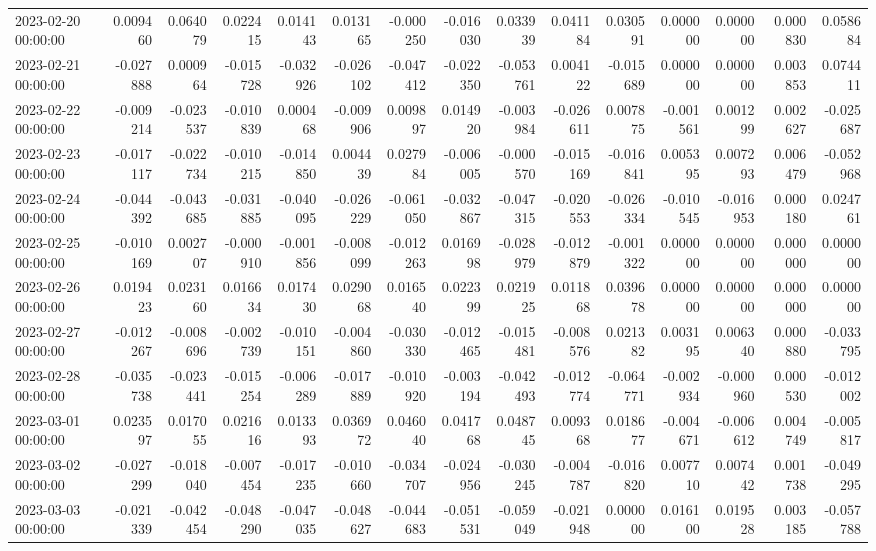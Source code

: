 \begin{tabular}{lrrrrrrrrrrrrrr}
2023-02-20 00:00:00 & 0.009460 & 0.064079 & 0.022415 & 0.014143 & 0.013165 & -0.000250 & -0.016030 & 0.033939 & 0.041184 & 0.030591 & 0.000000 & 0.000000 & 0.000830 & 0.058684 \\
2023-02-21 00:00:00 & -0.027888 & 0.000964 & -0.015728 & -0.032926 & -0.026102 & -0.047412 & -0.022350 & -0.053761 & 0.004122 & -0.015689 & 0.000000 & 0.000000 & 0.003853 & 0.074411 \\
2023-02-22 00:00:00 & -0.009214 & -0.023537 & -0.010839 & 0.000468 & -0.009906 & 0.009897 & 0.014920 & -0.003984 & -0.026611 & 0.007875 & -0.001561 & 0.001299 & 0.002627 & -0.025687 \\
2023-02-23 00:00:00 & -0.017117 & -0.022734 & -0.010215 & -0.014850 & 0.004439 & 0.027984 & -0.006005 & -0.000570 & -0.015169 & -0.016841 & 0.005395 & 0.007293 & 0.006479 & -0.052968 \\
2023-02-24 00:00:00 & -0.044392 & -0.043685 & -0.031885 & -0.040095 & -0.026229 & -0.061050 & -0.032867 & -0.047315 & -0.020553 & -0.026334 & -0.010545 & -0.016953 & 0.000180 & 0.024761 \\
2023-02-25 00:00:00 & -0.010169 & 0.002707 & -0.000910 & -0.001856 & -0.008099 & -0.012263 & 0.016998 & -0.028979 & -0.012879 & -0.001322 & 0.000000 & 0.000000 & 0.000000 & 0.000000 \\
2023-02-26 00:00:00 & 0.019423 & 0.023160 & 0.016634 & 0.017430 & 0.029068 & 0.016540 & 0.022399 & 0.021925 & 0.011868 & 0.039678 & 0.000000 & 0.000000 & 0.000000 & 0.000000 \\
2023-02-27 00:00:00 & -0.012267 & -0.008696 & -0.002739 & -0.010151 & -0.004860 & -0.030330 & -0.012465 & -0.015481 & -0.008576 & 0.021382 & 0.003195 & 0.006340 & 0.000880 & -0.033795 \\
2023-02-28 00:00:00 & -0.035738 & -0.023441 & -0.015254 & -0.006289 & -0.017889 & -0.010920 & -0.003194 & -0.042493 & -0.012774 & -0.064771 & -0.002934 & -0.000960 & 0.000530 & -0.012002 \\
2023-03-01 00:00:00 & 0.023597 & 0.017055 & 0.021616 & 0.013393 & 0.036972 & 0.046040 & 0.041768 & 0.048745 & 0.009368 & 0.018677 & -0.004671 & -0.006612 & 0.004749 & -0.005817 \\
2023-03-02 00:00:00 & -0.027299 & -0.018040 & -0.007454 & -0.017235 & -0.010660 & -0.034707 & -0.024956 & -0.030245 & -0.004787 & -0.016820 & 0.007710 & 0.007442 & 0.001738 & -0.049295 \\
2023-03-03 00:00:00 & -0.021339 & -0.042454 & -0.048290 & -0.047035 & -0.048627 & -0.044683 & -0.051531 & -0.059049 & -0.021948 & 0.000000 & 0.016100 & 0.019528 & 0.003185 & -0.057788 \\

\end{tabular}
